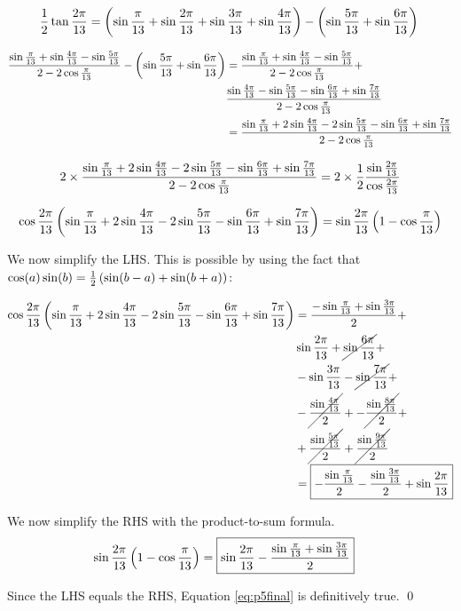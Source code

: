 \documentclass[10pt]{../usamts}
\begin{document}
\begin{solution}
\begin{equation*}
    \frac{1}{2} \tan{{\frac{2\pi}{13}}} = \left( \sin{{\frac{\pi}{13}}} + \sin{{\frac{2\pi}{13}}} + \sin{{\frac{3\pi}{13}}} + \sin{{\frac{4\pi}{13}}} \right) - \left( \sin{{\frac{5\pi}{13}}} + \sin{{\frac{6\pi}{13}}} \right) \\
\end{equation*}

\begin{align*}
    \frac{\sin{{\frac{\pi}{13}}} + \sin{{\frac{4\pi}{13}}} - \sin{{\frac{5\pi}{13}}}} {2 - 2\cos{{\frac{\pi}{13}}}}
    -\left( \sin{{\frac{5\pi}{13}}} + \sin{{\frac{6\pi}{13}}} \right)
    &= \frac{\sin{{\frac{\pi}{13}}} + \sin{{\frac{4\pi}{13}}} - \sin{{\frac{5\pi}{13}}}} {2 - 2\cos{{\frac{\pi}{13}}}} +\\
    & \frac{\sin{{\frac{4\pi}{13}}} - \sin{{\frac{5\pi}{13}}} -\sin{{\frac{6\pi}{13}}} + \sin{{\frac{7\pi}{13}}}} {2 - 2\cos{{\frac{\pi}{13}}}} \\
    &= \frac{\sin{{\frac{\pi}{13}}} + 2\sin{{\frac{4\pi}{13}}} - 2\sin{{\frac{5\pi}{13}}} - \sin{{\frac{6\pi}{13}}} + \sin{{\frac{7\pi}{13}}}} {2 - 2\cos{{\frac{\pi}{13}}}} \\
\end{align*}

\begin{equation*}
    2 \times \frac{\sin{{\frac{\pi}{13}}} + 2\sin{{\frac{4\pi}{13}}} - 2\sin{{\frac{5\pi}{13}}} - \sin{{\frac{6\pi}{13}}} + \sin{{\frac{7\pi}{13}}}} {2 - 2\cos{{\frac{\pi}{13}}}}
    = 2 \times \frac{1}{2} \frac{\sin{{\frac{2\pi}{13}}}}{\cos{{\frac{2\pi}{13}}}} \\
\end{equation*}

\begin{equation}
    \cos{{\frac{2\pi}{13}}}\left( \sin{{\frac{\pi}{13}}} + 2\sin{{\frac{4\pi}{13}}} - 2\sin{{\frac{5\pi}{13}}} - \sin{{\frac{6\pi}{13}}} + \sin{{\frac{7\pi}{13}}} \right)
    = \sin{{\frac{2\pi}{13}}}\left( 1 - \cos{{\frac{\pi}{13}}} \right)
    \label{eq:p5final}
\end{equation}

We now simplify the LHS. This is possible by using the fact that $\cos(a)\sin(b) = \frac{1}{2}\left( \sin(b-a) + \sin(b+a) \right)$:

\begin{align*}
    \cos{{\frac{2\pi}{13}}}\left( \sin{{\frac{\pi}{13}}} + 2\sin{{\frac{4\pi}{13}}} - 2\sin{{\frac{5\pi}{13}}} - \sin{{\frac{6\pi}{13}}} + \sin{{\frac{7\pi}{13}}} \right)
    &= \frac{-\sin{{\frac{\pi}{13}}} + \sin{{\frac{3\pi}{13}}}}{2} + \\
    &\sin{{\frac{2\pi}{13}}} + \cancel{\sin{{\frac{6\pi}{13}}}} + \\
    &- \sin{{\frac{3\pi}{13}}} -\cancel{\sin{{\frac{7\pi}{13}}}} + \\
    &-\cancel{\frac{\sin{{\frac{4\pi}{13}}}}{2}} + -\cancel{\frac{\sin{{\frac{8\pi}{13}}}}{2}} +\\
    &+ \cancel{\frac{\sin{{\frac{5\pi}{13}}}}{2}} + \cancel{\frac{\sin{{\frac{9\pi}{13}}}}{2}} \\
    &= \boxed{-\frac{\sin{{\frac{\pi}{13}}}}{2} - \frac{\sin{{\frac{3\pi}{13}}}}{2} + \sin{{\frac{2\pi}{13}}}}
\end{align*}

We now simplify the RHS with the product-to-sum formula.
\begin{align*}
    \sin{{\frac{2\pi}{13}}}\left( 1 - \cos{{\frac{\pi}{13}}} \right)
    &= \boxed{\sin{{\frac{2\pi}{13}}} - \frac{\sin{{\frac{\pi}{13}}} + \sin{{\frac{3\pi}{13}}}}{2}}
\end{align*}

Since the LHS equals the RHS, Equation \ref{eq:p5final} is definitively true.
\qed
\end{solution}
\end{document}
